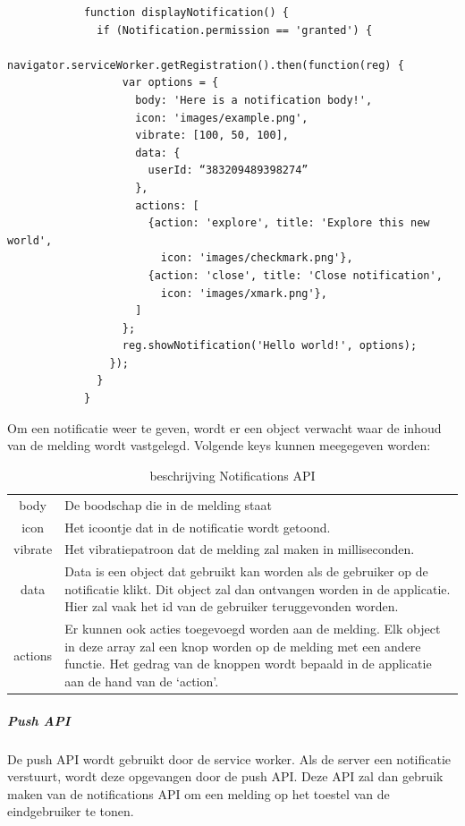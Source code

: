 			\begin{lstlisting}
			function displayNotification() {
			  if (Notification.permission == 'granted') {
			    navigator.serviceWorker.getRegistration().then(function(reg) {
			      var options = {
			        body: 'Here is a notification body!',
			        icon: 'images/example.png',
			        vibrate: [100, 50, 100],
			        data: {
			          userId: “383209489398274”
			        },
			        actions: [
			          {action: 'explore', title: 'Explore this new world',
			            icon: 'images/checkmark.png'},
			          {action: 'close', title: 'Close notification',
			            icon: 'images/xmark.png'},
			        ]
			      };
			      reg.showNotification('Hello world!', options);
			    });
			  }
			}
			\end{lstlisting}
		

		
			Om een notificatie weer te geven, wordt er een object verwacht waar de inhoud van de melding wordt vastgelegd. Volgende keys kunnen meegegeven worden:
			
				
			\begin{table}[H]
				\centering
				\begin{tabular}{cp{12cm}}
			       body & De boodschap die in de melding staat  \\
			       icon & Het icoontje dat in de notificatie wordt getoond. \\
			       vibrate & Het vibratiepatroon dat de melding zal maken in milliseconden. \\
			       data & Data is een object dat gebruikt kan worden als de gebruiker op de notificatie  klikt. Dit object zal dan ontvangen worden in de applicatie. Hier zal vaak het id van de gebruiker teruggevonden worden. \\
			       actions & Er kunnen ook acties toegevoegd worden aan de melding. Elk object in deze array zal een knop worden op de melding met een andere functie. Het gedrag van de knoppen wordt bepaald in de applicatie aan de hand van de ‘action’. \\
				\end{tabular}	
				\caption{beschrijving Notifications API}
			\end{table}
			
			\autocite{Developers2019}
			\autocite{Mozilla2019a}
		
		
		
		\subparagraph{Push API}
		
			De push API wordt gebruikt door de service worker. Als de server een notificatie verstuurt, wordt deze opgevangen door de push API. Deze API zal dan gebruik maken van de notifications API om een melding op het toestel van de eindgebruiker te tonen.
			\autocite{Mozilla2019b}
			\autocite{Gaunt2020}
	
